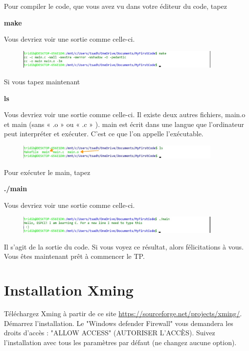 \documentclass{article}
\begin{document}
Pour compiler le code, que vous avez vu dans votre éditeur du code, tapez
\begin{tcolorbox}[width=\textwidth,colframe=BurntOrange,colback={black},title={ubuntu terminal},outer arc=0mm,colupper=white]   
      \large\textbf{  make }
\end{tcolorbox}

Vous devriez voir une sortie comme celle-ci.
\begin{figure}[H]
\center
\includegraphics[width=0.9\textwidth]{Plots/FirstCode_6.jpeg}
\end{figure}
Si vous tapez maintenant 
\begin{tcolorbox}[width=\textwidth,colframe=BurntOrange,colback={black},title={ubuntu terminal},outer arc=0mm,colupper=white] 
      \large\textbf{  ls }
\end{tcolorbox}
Vous devriez voir une sortie comme celle-ci. Il existe deux autres fichiers, main.o et main (sans « .o » ou « .c » ). main est écrit dans une langue que l'ordinateur peut interpréter et exécuter. C'est ce que l'on appelle l'exécutable.
 \begin{figure}[H]
\center
\includegraphics[width=0.9\textwidth]{Plots/FirstCode_7.jpeg}
\end{figure}
Pour exécuter le main, tapez
\begin{tcolorbox}[width=\textwidth,colframe=BurntOrange,colback={black},title={ubuntu terminal},outer arc=0mm,colupper=white]  
      \large\textbf{  ./main }
\end{tcolorbox}
Vous devriez voir une sortie comme celle-ci. 
\begin{figure}[H]
\center
\includegraphics[width=0.9\textwidth]{Plots/FirstCode_8.jpeg}
\end{figure}
Il s'agit de la sortie du code. Si vous voyez ce résultat, alors félicitations à vous. Vous êtes maintenant prêt à commencer le TP.

\section{Installation Xming}
Téléchargez Xming à partir de ce site \href{https://sourceforge.net/projects/xming/}{https://sourceforge.net/projects/xming/}. Démarrez l'installation. Le "Windows defender Firewall" vous demandera les droits d'accès : "ALLOW ACCESS" (AUTORISER L'ACCÈS). Suivez l'installation avec tous les paramètres par défaut (ne changez aucune option).
\end{document}
